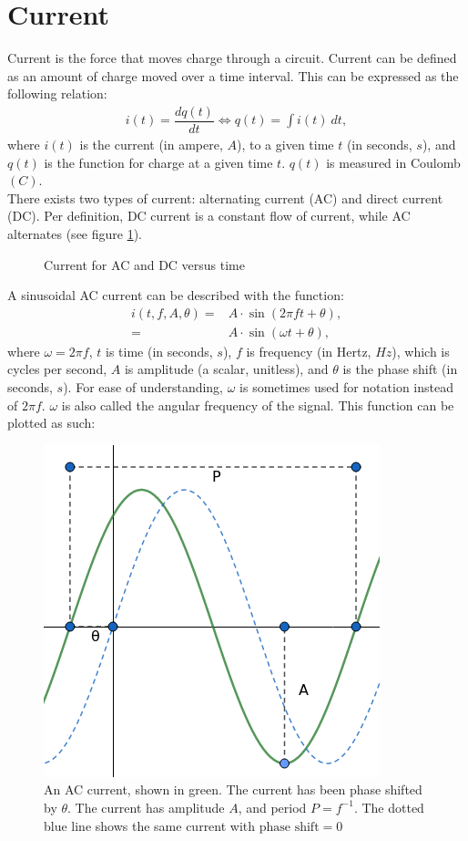 \section{Current}
Current is the force that moves charge through a circuit. Current can be defined as an amount of charge moved over a time interval. This can be expressed as the following relation: \cite[p.~3]{bcircuit5}
\begin{align}
i(t)=\dfrac{dq(t)}{dt} \Leftrightarrow q(t)=\int i(t)\ dt,\label{I=dq/dt}
\end{align}
where $i(t)$ is the current (in ampere, $A$), to a given time $t$ (in seconds, $s$), and $q(t)$ is the function for charge at a given time $t$. $q(t)$ is measured in Coulomb $(C)$.
\\
There exists two types of current: alternating current (AC) and direct current (DC). Per definition, DC current is a constant flow of current, while AC alternates (see figure \ref{fig:ACDC}). 
\begin{figure}[H] 

\caption{Current for AC and DC versus time}
\label{fig:ACDC}
\end{figure}
\noindent
A sinusoidal AC current can be described with the function: 
\begin{align}
i\left(t, f, A, \theta\right) =& A\cdot \sin{\left(2\pi ft + \theta\right)}, \nonumber
\\
=& A \cdot \sin{\left(\omega t + \theta\right)}, \label{eq:omega}
\end{align}
where $\omega = 2\pi f$, $t$ is time (in seconds, $s$), $f$ is frequency (in Hertz, $Hz$), which is cycles per second, $A$ is amplitude (a scalar, unitless), and $\theta$ is the phase shift (in seconds, $s$).
For ease of understanding, $\omega$ is sometimes used for notation instead of $2\pi f$. $\omega$ is also called the angular frequency of the signal.
This function can be plotted as such:
\begin{figure}[H]
	\centering
	\includegraphics[scale=0.7]{fig/img/AC.png}
	\caption{An AC current, shown in green. The current has been phase shifted by $\theta$. The current has amplitude $A$, and period $P=f^{-1}$. The dotted blue line shows the same current with $\text{phase shift} =0$}
\end{figure}

